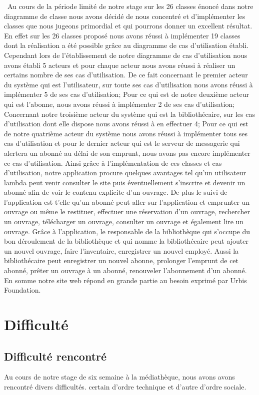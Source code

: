 \documentclass[14pt,a4paper]{article}
\begin{document}
\ Au cours de la période limité de notre stage sur les 26 classes énoncé dans notre diagramme de classe nous avons décidé de nous concentré et d'implémenter les classes que nous jugeons primordial et qui pourrons donner un excellent résultat. En effet sur les 26 classes proposé nous avons réussi à implémenter 19 classes dont la réalisation a été possible grâce au diagramme de cas d'utilisation établi. Cependant lors de l'établissement de notre diagramme de cas d'utilisation nous avons établi 5 acteurs et pour chaque acteur nous avons réussi à réaliser un certains nombre de ses cas d'utilisation. De ce fait concernant le premier acteur du système qui est l'utilisateur, sur toute ses cas d'utilisation nous avons réussi à implémenter 5 de ses cas d'utilisation; Pour ce qui est de notre deuxième acteur qui est l'abonne, nous avons réussi à implémenter 2 de ses cas d'utilisation; Concernant notre troisième acteur du système qui est la bibliothécaire, sur les cas d'utilisation dont elle dispose nous avons réussi à en effectuer 4; Pour ce qui est de notre quatrième acteur du système nous avons réussi à implémenter tous ses cas d'utilisation et pour le dernier acteur qui est le serveur de messagerie qui alertera un abonné au délai de son emprunt, nous avons pas encore implémenter ce cas d'utilisation. Ainsi grâce à l'implémentation de ces classes et cas d'utilisation, notre application procure quelques avantages tel qu'un utilisateur lambda peut venir consulter le site puis éventuellement s'inscrire et devenir un abonné afin de voir le contenu explicite d'un ouvrage. De plus le suivi de l'application est t'elle qu'un abonné peut aller sur l'application et emprunter un ouvrage ou même le restituer, effectuer une réservation d'un ouvrage, rechercher un ouvrage, télécharger un ouvrage, consulter un ouvrage et également lire un ouvrage. Grâce à l'application, le responsable de la bibliothèque qui s'occupe du bon déroulement de la bibliothèque et qui nomme la bibliothécaire peut ajouter un nouvel ouvrage, faire l'inventaire, enregistrer un nouvel employé. Aussi la bibliothécaire peut enregistrer un nouvel abonne, prolonger l'emprunt de cet abonné, prêter un ouvrage à un abonné, renouveler l'abonnement d'un abonné. En somme notre site web répond en grande partie au besoin exprimé par Urbis Foundation.
\section{Difficulté}
\subsection{Difficulté rencontré}
Au cours de notre stage de six semaine à la médiathèque, nous avons avons rencontré divers 
difficultés. certain d'ordre technique et d'autre d'ordre sociale.
\end{document}
